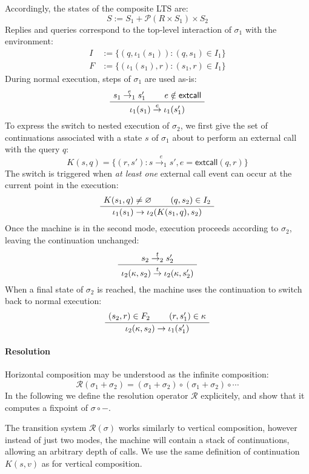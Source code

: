\documentclass[acmsmall,10pt,review,anonymous]{acmart}
\newcommand{\kw}[1]{\ensuremath{ \textsf{#1} }}
\begin{document}
Accordingly,
the states of the composite LTS are:
\[
  S := S_1 + \mathcal{P}(R \times S_1) \times S_2
\]
Replies and queries
correspond to the top-level interaction of $\sigma_1$ with the environment:
\begin{align*}
  I &:= \{ (q, \iota_1(s_1)) : (q, s_1) \in I_1 \} \\
  F &:= \{ (\iota_1(s_1), r) : (s_1, r) \in I_1 \}
\end{align*}
During normal execution,
steps of $\sigma_1$ are used as-is:
\[
  \AxiomC{$s_1 \stackrel{e}{\rightarrow_1} s_1'$}
  \AxiomC{$e \notin \kw{extcall}$}
  \BinaryInfC{$\iota_1(s_1) \stackrel{e}{\rightarrow} \iota_1(s_1')$}
  \DisplayProof
\]
To express the switch to nested execution of $\sigma_2$,
we first give the set of continuations associated with a state $s$ of $\sigma_1$
about to perform an external call with the query $q$:
\[
  K(s, q) =
    \{ (r, s') : s \stackrel{e}{\rightarrow_1} s',
                     e = \kw{extcall}(q, r) \}
\]
The switch is triggered when \emph{at least one} external call event
can occur at the current point in the execution:
\[
  \AxiomC{$K(s_1, q) \ne \varnothing$}
  \AxiomC{$(q, s_2) \in I_2$}
  \BinaryInfC{$\iota_1(s_1) \rightarrow \iota_2(K(s_1, q), s_2)$}
  \DisplayProof
\]
Once the machine is in the second mode,
execution proceeds according to $\sigma_2$,
leaving the continuation unchanged:
\[
  \AxiomC{$s_2 \stackrel{t}{\rightarrow_2} s_2'$}
  \UnaryInfC{$
    \iota_2(\kappa, s_2)
    \stackrel{t}{\rightarrow}
    \iota_2(\kappa, s_2')$}
  \DisplayProof
\]
When a final state of $\sigma_2$ is reached,
the machine uses the continuation to switch back
to normal execution:
\[
  \AxiomC{$(s_2, r) \in F_2$}
  \AxiomC{$(r, s_1') \in \kappa$}
  \BinaryInfC{$\iota_2(\kappa, s_2) \rightarrow \iota_1(s_1')$}
  \DisplayProof
\]


\paragraph{Resolution} %

Horizontal composition may be understood as the infinite composition:
\[
  \mathcal{R}(\sigma_1 + \sigma_2) =
    (\sigma_1 + \sigma_2) \circ (\sigma_1 + \sigma_2) \circ \cdots
\]
In the following
we define the resolution operator $\mathcal{R}$ explicitely,
and show that it computes a fixpoint of $\sigma \circ -$.

The transition system $\mathcal{R}(\sigma)$
works similarly to vertical composition,
however instead of just two modes,
the machine will contain a stack of continuations,
allowing an arbitrary depth of calls.
We use the same definition of continuation $K(s, v)$
as for vertical composition.
\end{document}
